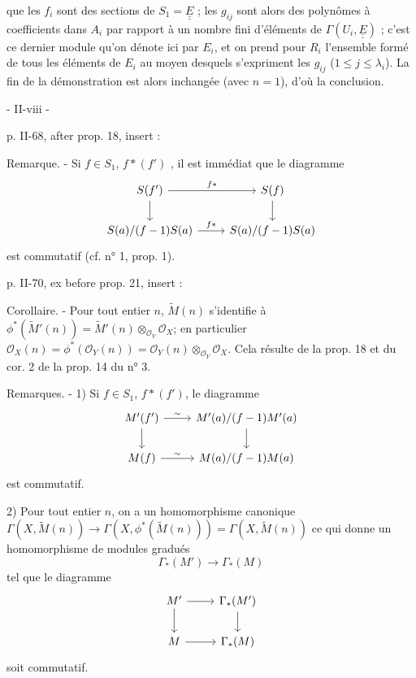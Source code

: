 que les $f_i$ sont des sections de $S_1 = \underline{\underline{E}}$ ; les $g_{ij}$ sont alors des polynômes à coefficients dans $A_i$ par rapport à un nombre fini d'éléments de $\Gamma(U_i, \underline{\underline{E}})$ ; c'est ce dernier module qu'on dénote ici par $E_i$, et on prend pour $R_i$ l'ensemble formé de tous les éléments de $E_i$ au moyen desquels s'expriment les $g_{ij}$ ($1 \le j \le \lambda_i$). La fin de la démonstration est alors inchangée (avec $n=1$), d'où la conclusion.

\newpage



- II-viii -

p. II-68, after prop. 18, insert :

Remarque. - Si $f \in S_1$, $f \ast (f')$ , il est immédiat que le diagramme
$$\begin{tikzcd}
S(f') \arrow[r, "f \ast"] \arrow[d] & S(f) \arrow[d] \\
S(a)/(f-1)S(a) \arrow[r, "f \ast"] & S(a)/(f-1)S(a)
\end{tikzcd}$$
est commutatif (cf. n° 1, prop. 1).

p. II-70, ex before prop. 21, insert :

Corollaire. - Pour tout entier $n$, $\tilde{M}(n)$ s'identifie à $\phi^*(\tilde{M}'(n)) = \tilde{M}'(n) \otimes_{\mathcal{O}_Y} \mathcal{O}_X$; en particulier $\mathcal{O}_X(n) = \phi^*(\mathcal{O}_Y(n)) = \mathcal{O}_Y(n) \otimes_{\mathcal{O}_Y} \mathcal{O}_X$.
Cela résulte de la prop. 18 et du cor. 2 de la prop. 14 du n° 3.

Remarques. - 1) Si $f \in S_1$, $f \ast (f')$, le diagramme
$$\begin{tikzcd}
M'(f') \arrow[r, "\sim"] \arrow[d] & M'(a)/(f-1)M'(a) \arrow[d] \\
M(f) \arrow[r, "\sim"] & M(a)/(f-1)M(a)
\end{tikzcd}$$
est commutatif.

2) Pour tout entier $n$, on a un homomorphisme canonique
$\Gamma(X, \tilde{M}(n)) \to \Gamma(X, \phi^*(\tilde{M}(n))) = \Gamma(X, \tilde{M}(n))$
ce qui donne un homomorphisme de modules gradués
$$\Gamma_*(M') \to \Gamma_*(M)$$
tel que le diagramme
$$\begin{tikzcd}
M' \arrow[r] \arrow[d] & \Gamma_*(M') \arrow[d] \\
M \arrow[r] & \Gamma_*(M)
\end{tikzcd}$$
soit commutatif.


